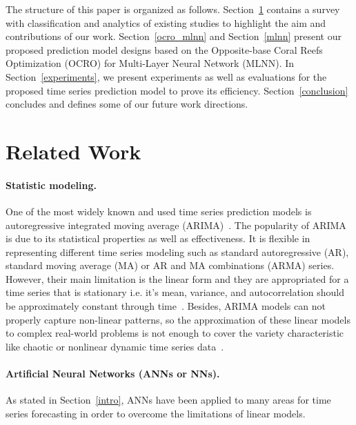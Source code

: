 \documentclass[11pt,twoside]{article}
\begin{document}
\begin{multicols}{2}
The structure of this paper is organized as follows. Section~\ref{related_work} contains a survey with classification and analytics of existing studies to highlight the aim and contributions of our work. Section~\ref{ocro_mlnn} and Section~\ref{mlnn} present our proposed prediction model designs based on the Opposite-base Coral Reefs Optimization (OCRO) for Multi-Layer Neural Network (MLNN). In Section~\ref{experiments}, we present experiments as well as evaluations for the proposed time series prediction model to prove its efficiency. Section~\ref{conclusion} concludes and defines some of our future work directions.

\section{Related Work}
\label{related_work}

\paragraph{Statistic modeling.} One of the most widely known and used time series prediction models is autoregressive integrated moving average (ARIMA)~\citep{ref_mckenzie}. The popularity of ARIMA is due to its statistical properties as well as effectiveness. It is flexible in representing different time series modeling such as standard autoregressive (AR), standard moving average (MA) or AR and MA combinations (ARMA) series. However, their main limitation is the linear form and they are appropriated for a time series that is stationary i.e. it's mean, variance, and autocorrelation should be approximately constant through time~\citep{petricua2016limitation}. Besides, ARIMA models can not properly capture non-linear patterns, so the approximation of these linear models to complex real-world problems is not enough to cover the variety characteristic like chaotic or nonlinear dynamic time series data~\citep{kajitani2005forecasting}. 

\paragraph{Artificial Neural Networks (ANNs or NNs).} As stated in Section~\ref{intro}, ANNs have been applied to many areas for time series forecasting in order to overcome the limitations of linear models. 


\end{multicols}
\end{document}
